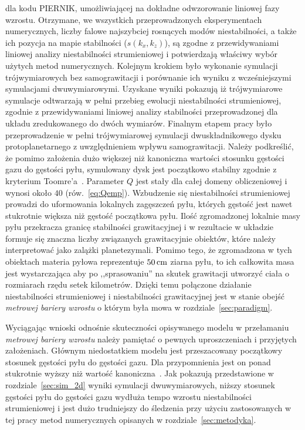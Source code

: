 dla kodu \textsc{PIERNIK}, umożliwiającej na dokładne odwzorowanie liniowej fazy
wzrostu.  Otrzymane, we wszystkich przeprowadzonych eksperymentach numerycznych,
liczby falowe najszybciej rosnących modów niestabilności, a także ich pozycja na
mapie stabilności ($s(k_x, k_z)$), są zgodne z przewidywaniami liniowej analizy
niestabilności strumieniowej i potwierdzają właściwy wybór użytych metod
numerycznych. Kolejnym krokiem było wykonanie symulacji trójwymiarowych bez
samograwitacji i porównanie ich wyniku z wcześniejszymi symulacjami
dwuwymiarowymi. Uzyskane wyniki pokazują iż trójwymiarowe symulacje odtwarzają w
pełni przebieg ewolucji niestabilności strumieniowej, zgodnie z przewidywaniami
liniowej analizy stabilności przeprowadzonej dla układu zredukowanego do dwóch
wymiarów. Finalnym etapem pracy było przeprowadzenie w pełni trójwymiarowej
symulacji dwuskładnikowego dysku protoplanetarnego z uwzględnieniem wpływu
samograwitacji. Należy podkreślić, że pomimo założenia dużo większej niż
kanoniczna wartości stosunku gęstości gazu do gęstości pyłu, symulowany dysk
jest początkowo stabilny zgodnie z kryterium Toomre'a~.
Parameter $Q$ jest stały dla całej domeny obliczeniowej i wynosi około $40$
(rów.~\ref{eq:Qemp}). Wzbudzenie się niestabilności strumieniowej prowadzi do
uformowania lokalnych zagęszczeń pyłu, których gęstość jest nawet stukrotnie
większa niż gęstość początkowa pyłu. Ilość zgromadzonej lokalnie masy pyłu
przekracza granicę stabilności grawitacyjnej i w rezultacie w układzie formuje
się znaczna liczby związanych grawitacyjnie obiektów, które należy interpretować
jako zalążki planetezymali. Pomimo tego, że zgromadzona w tych obiektach materia
pyłowa reprezentuje $50\hbox{$\thinspace\textrm{cm}$}$ ziarna pyłu, to ich całkowita masa jest
wystarczająca aby po ,,sprasowaniu'' na skutek grawitacji utworzyć ciała o
rozmiarach rzędu setek kilometrów. Dzięki temu połączone działanie
niestabilności strumieniowej i niestabilności grawitacyjnej jest w stanie obejść
\emph{metrowej bariery wzrostu} o którym była mowa w
rozdziale~\ref{sec:paradigm}.
%
\par Wyciągając wnioski odnośnie skuteczności opisywanego modelu w przełamaniu
\emph{metrowej bariery wzrostu} należy pamiętać o pewnych uproszczeniach i
przyjętych założeniach. Głównym niedostatkiem modelu jest przeszacowany
początkowy stosunek gęstości pyłu do gęstości gazu. Dla przypomnienia jest on
ponad stukrotnie wyższy niż wartość kanoniczna~\cite{FS03}. Jak pokazują
przedstawione w rozdziale~\ref{sec:sim_2d} wyniki symulacji dwuwymiarowych,
niższy stosunek gęstości pyłu do gęstości gazu wydłuża tempo wzrostu
niestabilności strumieniowej i jest dużo trudniejszy do śledzenia przy użyciu
zastosowanych w tej pracy metod numerycznych opisanych w
rozdziale~\ref{sec:metodyka}. 

